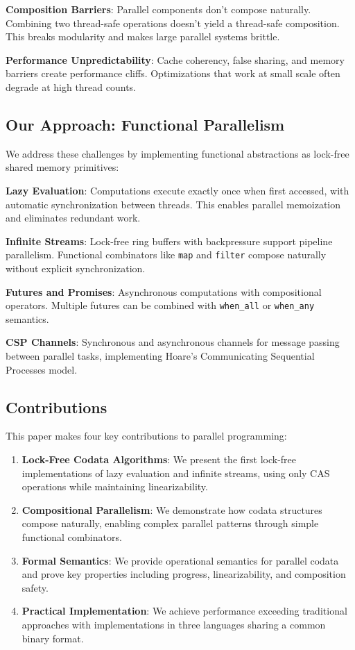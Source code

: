 \documentclass[sigconf,review,anonymous]{acmart}
\begin{document}
\textbf{Composition Barriers}: Parallel components don't compose naturally. Combining two thread-safe operations doesn't yield a thread-safe composition. This breaks modularity and makes large parallel systems brittle.

\textbf{Performance Unpredictability}: Cache coherency, false sharing, and memory barriers create performance cliffs. Optimizations that work at small scale often degrade at high thread counts.

\subsection{Our Approach: Functional Parallelism}

We address these challenges by implementing functional abstractions as lock-free shared memory primitives:

\textbf{Lazy Evaluation}: Computations execute exactly once when first accessed, with automatic synchronization between threads. This enables parallel memoization and eliminates redundant work.

\textbf{Infinite Streams}: Lock-free ring buffers with backpressure support pipeline parallelism. Functional combinators like \texttt{map} and \texttt{filter} compose naturally without explicit synchronization.

\textbf{Futures and Promises}: Asynchronous computations with compositional operators. Multiple futures can be combined with \texttt{when\_all} or \texttt{when\_any} semantics.

\textbf{CSP Channels}: Synchronous and asynchronous channels for message passing between parallel tasks, implementing Hoare's Communicating Sequential Processes model.

\subsection{Contributions}

This paper makes four key contributions to parallel programming:

\begin{enumerate}
\item \textbf{Lock-Free Codata Algorithms}: We present the first lock-free implementations of lazy evaluation and infinite streams, using only CAS operations while maintaining linearizability.

\item \textbf{Compositional Parallelism}: We demonstrate how codata structures compose naturally, enabling complex parallel patterns through simple functional combinators.

\item \textbf{Formal Semantics}: We provide operational semantics for parallel codata and prove key properties including progress, linearizability, and composition safety.

\item \textbf{Practical Implementation}: We achieve performance exceeding traditional approaches with implementations in three languages sharing a common binary format.
\end{enumerate}
\end{document}
